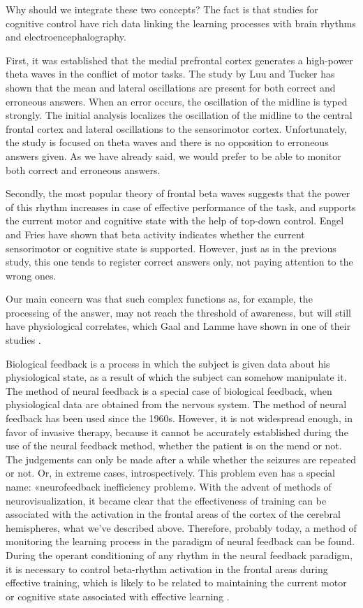 \documentclass[14pt,a4paper]{scrartcl}
\begin{document}
Why should we integrate these two concepts? The fact is that studies for cognitive control have rich data linking the learning processes with brain rhythms and electroencephalography.

First, it was established that the medial prefrontal cortex generates a high-power theta waves in the conflict of motor tasks. The study by Luu and Tucker \cite{Luu2001} has shown that the mean and lateral oscillations are present for both correct and erroneous answers. When an error occurs, the oscillation of the midline is typed strongly. The initial analysis localizes the oscillation of the midline to the central frontal cortex and lateral oscillations to the sensorimotor cortex. Unfortunately, the study is focused on theta waves and there is no opposition to erroneous answers given. As we have already said, we would prefer to be able to monitor both correct and erroneous answers.

Secondly, the most popular theory of frontal beta waves suggests that the power of this rhythm increases in case of effective performance of the task, and supports the current motor and cognitive state with the help of top-down control. Engel and Fries \cite{Engel2010} have shown that beta activity indicates whether the current sensorimotor or cognitive state is supported. However, just as in the previous study, this one tends to register correct answers only, not paying attention to the wrong ones.

Our main concern was that such complex functions as, for example, the processing of the answer, may not reach the threshold of awareness, but will still have physiological correlates, which Gaal and Lamme have shown in one of their studies \cite{VanGaal2012}.

Biological feedback is a process in which the subject is given data about his physiological state, as a result of which the subject can somehow manipulate it. The method of neural feedback is a special case of biological feedback, when physiological data are obtained from the nervous system. The method of neural feedback has been used since the 1960s. However, it is not widespread enough, in favor of invasive therapy, because it cannot be accurately established during the use of the neural feedback method, whether the patient is on the mend or not. The judgements can only be made after a while whether the seizures are repeated or not. Or, in extreme cases, introspectively. This problem even has a special name: «neurofeedback inefficiency problem». With the advent of methods of neurovisualization, it became clear that the effectiveness of training can be associated with the activation in the frontal areas of the cortex of the cerebral hemispheres, what we’ve described above. Therefore, probably today, a method of monitoring the learning process in the paradigm of neural feedback can be found. During the operant conditioning of any rhythm in the neural feedback paradigm, it is necessary to control beta-rhythm activation in the frontal areas during effective training, which is likely to be related to maintaining the current motor or cognitive state associated with effective learning \cite{Engel2010}.
\end{document}

